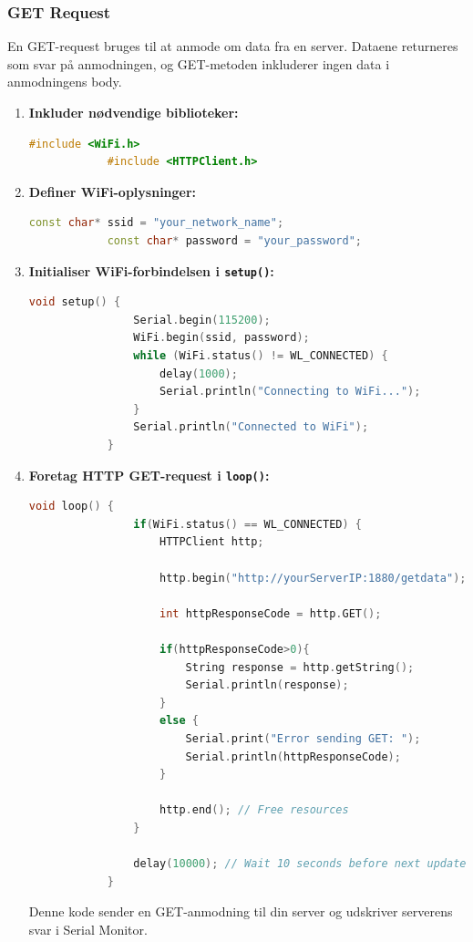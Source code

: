 \documentclass[12pt,a4paper]{book}
\begin{document}
	\subsubsection*{GET Request}
	En GET-request bruges til at anmode om data fra en server. Dataene returneres som svar på anmodningen, og GET-metoden inkluderer ingen data i anmodningens body.
	
	\begin{enumerate}
		\item \textbf{Inkluder nødvendige biblioteker:}
		\begin{lstlisting}[language=C++, caption=Include necessary libraries]
			#include <WiFi.h>
			#include <HTTPClient.h>
		\end{lstlisting}
		
		\item \textbf{Definer WiFi-oplysninger:}
		\begin{lstlisting}[language=C++, caption=Define WiFi credentials]
			const char* ssid = "your_network_name";
			const char* password = "your_password";
		\end{lstlisting}
		
		\item \textbf{Initialiser WiFi-forbindelsen i \texttt{setup()}:}
		\begin{lstlisting}[language=C++, caption=Initialize WiFi connection in setup()]
			void setup() {
				Serial.begin(115200);
				WiFi.begin(ssid, password);
				while (WiFi.status() != WL_CONNECTED) {
					delay(1000);
					Serial.println("Connecting to WiFi...");
				}
				Serial.println("Connected to WiFi");
			}
		\end{lstlisting}
		
		\item \textbf{Foretag HTTP GET-request i \texttt{loop()}:}
		\begin{lstlisting}[language=C++, caption=Create HTTP connection in loop()]
			void loop() {
				if(WiFi.status() == WL_CONNECTED) {
					HTTPClient http;
					
					http.begin("http://yourServerIP:1880/getdata"); // Specify the URL
					
					int httpResponseCode = http.GET();
					
					if(httpResponseCode>0){
						String response = http.getString();
						Serial.println(response);
					}
					else {
						Serial.print("Error sending GET: ");
						Serial.println(httpResponseCode);
					}
					
					http.end(); // Free resources
				}
				
				delay(10000); // Wait 10 seconds before next update
			}
		\end{lstlisting}
		Denne kode sender en GET-anmodning til din server og udskriver serverens svar i Serial Monitor.
	\end{enumerate}
	
\end{document}
